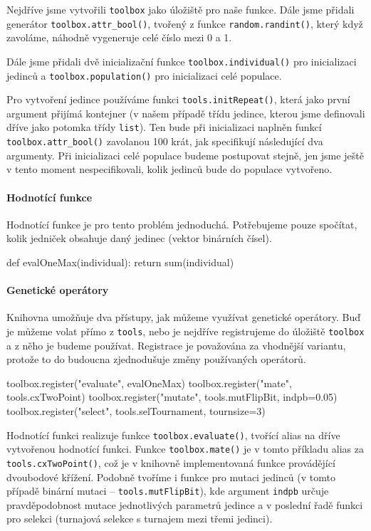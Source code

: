 Nejdříve jsme vytvořili \texttt{toolbox} jako úložiště pro naše funkce. Dále
jsme přidali generátor \texttt{toolbox.attr\_bool()}, tvořený z funkce
\texttt{random.randint()}, který když zavoláme, náhodně vygeneruje celé číslo
mezi 0 a 1.

Dále jsme přidali dvě inicializační funkce \texttt{toolbox.individual()} pro
inicializaci jedinců a \texttt{toolbox.population()} pro inicializaci celé
populace. 

Pro vytvoření jedince používáme funkci \texttt{tools.initRepeat()}, která jako
první argument přijímá kontejner (v našem případě třídu jedince, kterou jsme
definovali dříve jako potomka třídy \texttt{list}). Ten bude při inicializaci
naplněn funkcí \texttt{toolbox.attr\_bool()} zavolanou 100 krát, jak
specifikují následující dva argumenty. Při inicializaci celé populace budeme
postupovat stejně, jen jsme ještě v tento moment nespecifikovali, kolik jedinců
bude do populace vytvořeno.

\paragraph{Hodnotící funkce}
Hodnotící funkce je pro tento problém jednoduchá. Potřebujeme pouze spočítat,
kolik jedniček obsahuje daný jedinec (vektor binárních čísel).

\begin{code}
def evalOneMax(individual):
    return sum(individual)
\end{code}

\paragraph{Genetické operátory}
Knihovna umožňuje dva přístupy, jak můžeme využívat genetické operátory. Buď je
můžeme volat přímo z \texttt{tools}, nebo je nejdříve registrujeme do úložiště
\texttt{toolbox} a z něho je budeme používat. Registrace je považována za
vhodnější variantu, protože to do budoucna zjednodušuje změny používaných
operátorů.

\begin{code}
toolbox.register("evaluate", evalOneMax)
toolbox.register("mate", tools.cxTwoPoint)
toolbox.register("mutate", tools.mutFlipBit, indpb=0.05)
toolbox.register("select", tools.selTournament, tournsize=3)
\end{code}

Hodnotící funkci realizuje funkce \texttt{toolbox.evaluate()}, tvořící alias na
dříve vytvořenou hodnotící funkci. Funkce \texttt{toolbox.mate()} je v tomto
příkladu alias za \texttt{tools.cxTwoPoint()}, což je v knihovně implementovaná
funkce provádějící dvoubodové křížení. Podobně tvoříme i funkce pro mutaci
jedinců (v tomto případě binární mutaci -- \texttt{tools.mutFlipBit}), kde
argument \texttt{indpb} určuje pravděpodobnost mutace jednotlivých parametrů
jedince a v poslední řadě funkci pro selekci (turnajová selekce s turnajem mezi
třemi jedinci).
        
